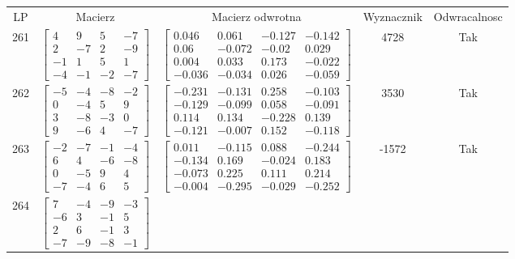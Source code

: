 \documentclass[a4paper,12pt]{article}
\begin{document}
\bgroup {} \vspace{0.2in} \begin{tabular}{c c c c c}
LP & Macierz & Macierz odwrotna & Wyznacznik & Odwracalnosc\\
261
&
$\begin{bmatrix} 4 & 9 & 5 & -7 \\ 2 & -7 & 2 & -9 \\ -1 & 1 & 5 & 1 \\ -4 & -1 & -2 & -7 \end{bmatrix}$
&
$\begin{bmatrix} 0.046 & 0.061 & -0.127 & -0.142 \\ 0.06 & -0.072 & -0.02 & 0.029 \\ 0.004 & 0.033 & 0.173 & -0.022 \\ -0.036 & -0.034 & 0.026 & -0.059 \end{bmatrix}$
&
4728
&
Tak
\\
262
&
$\begin{bmatrix} -5 & -4 & -8 & -2 \\ 0 & -4 & 5 & 9 \\ 3 & -8 & -3 & 0 \\ 9 & -6 & 4 & -7 \end{bmatrix}$
&
$\begin{bmatrix} -0.231 & -0.131 & 0.258 & -0.103 \\ -0.129 & -0.099 & 0.058 & -0.091 \\ 0.114 & 0.134 & -0.228 & 0.139 \\ -0.121 & -0.007 & 0.152 & -0.118 \end{bmatrix}$
&
3530
&
Tak
\\
263
&
$\begin{bmatrix} -2 & -7 & -1 & -4 \\ 6 & 4 & -6 & -8 \\ 0 & -5 & 9 & 4 \\ -7 & -4 & 6 & 5 \end{bmatrix}$
&
$\begin{bmatrix} 0.011 & -0.115 & 0.088 & -0.244 \\ -0.134 & 0.169 & -0.024 & 0.183 \\ -0.073 & 0.225 & 0.111 & 0.214 \\ -0.004 & -0.295 & -0.029 & -0.252 \end{bmatrix}$
&
-1572
&
Tak
\\
264
&
$\begin{bmatrix} 7 & -4 & -9 & -3 \\ -6 & 3 & -1 & 5 \\ 2 & 6 & -1 & 3 \\ -7 & -9 & -8 & -1 \end{bmatrix}$

\end{tabular}
\end{document}

